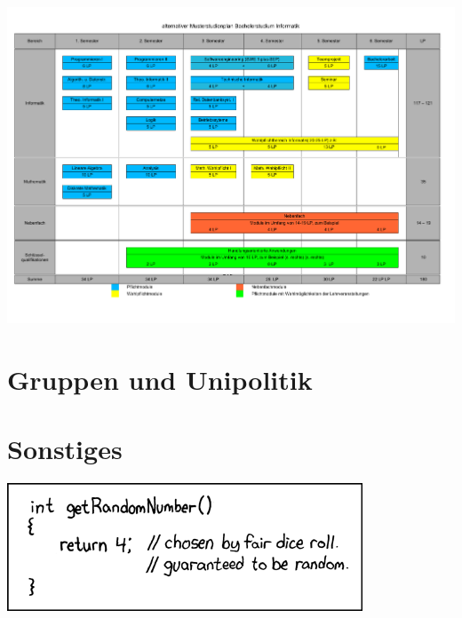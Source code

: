 \documentclass[]{papertex}
\begin{document}
		\begin{minipage}{1.0\linewidth}
		\begin{center} 
  			\includegraphics[angle=90,totalheight=\textheight,
			width=\textwidth
			]{bilder/studienplan_bsc_ws/studienplan_bsc.pdf}
  			\label{studienplan_neu}
		\end{center}
		\end{minipage}
	\newpage
	\section{Gruppen und Unipolitik}
		\label{politik}
		\begin{multicols}{2}
		\end{multicols}
	\newpage
	\section{Sonstiges}
		\label{sonstiges}
		\begin{center}
		\includegraphics[totalheight=3cm]{bilder/XKCD/random_number}
		\end{center}
		\begin{multicols}{2}
		\end{multicols}
		\begin{multicols}{2}
		
		\end{multicols}
		\newpage
		
\end{document}
